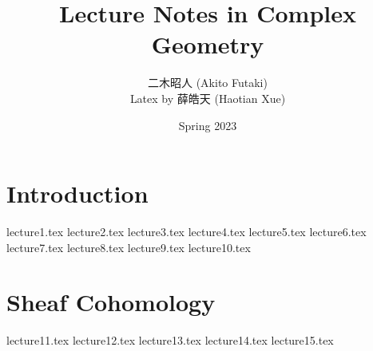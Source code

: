 \documentclass[twoside,12pt]{book}
\title{\Huge Lecture Notes in Complex Geometry}
\author{{\Large 二木昭人} (Akito Futaki)\\
Latex by 薛皓天 (Haotian Xue)}
\date{\Large Spring 2023}
\begin{document}
\maketitle
\frontmatter
\tableofcontents
\newpage
\mainmatter{}

\chapter{Introduction}
{lecture1.tex}
{lecture2.tex}
{lecture3.tex}
{lecture4.tex}
{lecture5.tex}
{lecture6.tex}
{lecture7.tex}
{lecture8.tex}
{lecture9.tex}
{lecture10.tex}
\chapter{Sheaf Cohomology}
{lecture11.tex}
{lecture12.tex}
{lecture13.tex}
{lecture14.tex}
{lecture15.tex}
\end{document}
